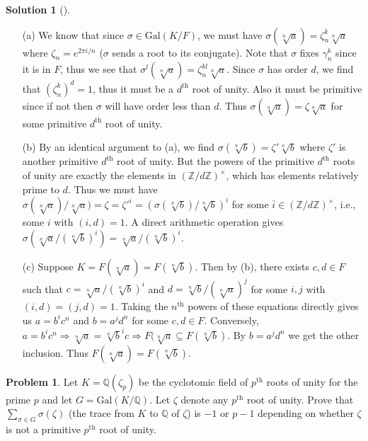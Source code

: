 \documentclass{article}
\theoremstyle{definition}
\newtheorem{prob}{Problem}
\newtheorem*{sol}{Solution}
\newenvironment{sols}[1][]{%
  \begin{sol}[#1]$ $\par\nobreak\ignorespaces
}{%
  \end{sol}
}
\newcommand{\QQ}{\mathbb Q}
\newcommand{\ZZ}{\mathbb Z}
\newcommand{\Ra}{\Rightarrow}
\newcommand{\Gal}{\text{Gal}}
\begin{document}
\begin{sols}
	\begin{enumerate}
		\item[(a)] We know that since $\sigma \in \Gal(K/F)$, we must have $\sigma(\sqrt[n]{a}) = \zeta_n^k \sqrt[n]{a}$ where $\zeta_n = e^{2 \pi i/n}$ ($\sigma$ sends a root to its conjugate).
			Note that $\sigma$ fixes $\gamma_n^k$ since it is in $F$, thus we see that $\sigma^l(\sqrt[n]{a}) = \zeta_n^{kl} \sqrt[n]{a}$.
			Since $\sigma$ has order $d$, we find that $(\zeta_n^k)^d = 1$, thus it must be a $d^{\text{th}}$ root of unity.
			Also it must be primitive since if not then $\sigma$ will have order less than $d$.
			Thus $\sigma(\sqrt[n]{a}) = \zeta \sqrt[n]{a}$ for some primitive $d^{\text{th}}$ root of unity.

		\item[(b)] By an identical argument to (a), we find $\sigma(\sqrt[n]{b}) = \zeta' \sqrt[n]{b}$ where $\zeta'$ is another primitive $d^{\text{th}}$ root of unity.
			But the powers of the primitive $d^{\text{th}}$ roots of unity are exactly the elements in $(\ZZ/d \ZZ)^\times$, which has elements relatively prime to $d$.
			Thus we must have $\sigma(\sqrt[n]{a})/\sqrt[n]{a}) = \zeta = \zeta'^i = (\sigma(\sqrt[n]{b})/\sqrt[n]{b})^i$ for some $\overline{i} \in (\ZZ/d \ZZ)^\times$, i.e., some $i$ with $(i, d) = 1$.
			A direct arithmetic operation gives $\sigma(\sqrt[n]{a}/(\sqrt[n]{b})^i) = \sqrt[n]{a}/(\sqrt[n]{b})^i$.

		\item[(c)] Suppose $K = F(\sqrt[n]{a}) = F(\sqrt[n]{b})$.
			Then by (b), there exists $c, d \in F$ such that $c = \sqrt[n]{a}/(\sqrt[n]{b})^i$ and $d = \sqrt[n]{b}/(\sqrt[n]{a})^j$ for some $i, j$ with $(i, d) = (j, d) = 1$.
			Taking the $n^{\text{th}}$ powers of these equations directly gives us $a = b^i c^n$ and $b = a^j d^n$ for some $c, d \in F$.
			Conversely, $a = b^i c^n \Ra \sqrt[n]{a} = \sqrt[n]{b}^i c \Ra F(\sqrt[n]{a} \subseteq F(\sqrt[n]{b})$.
			By $b = a^j d^n$ we get the other inclusion.
			Thus $F(\sqrt[n]{a}) = F(\sqrt[n]{b})$.
	\end{enumerate}
\end{sols}

\setcounter{prob}{9}
\begin{prob}
	Let $K = \QQ(\zeta_p)$ be the cyclotomic field of $p^{\text{th}}$ roots of unity for the prime $p$ and let $G = \Gal(K/\QQ)$.
	Let $\zeta$ denote any $p^{\text{th}}$ root of unity.
	Prove that $\sum_{\sigma \in G} \sigma(\zeta)$ (the trace from $K$ to $\QQ$ of $\zeta$) is $-1$ or $p - 1$ depending on whether $\zeta$ is not a primitive $p^{\text{th}}$ root of unity.
\end{prob}
\end{document}
